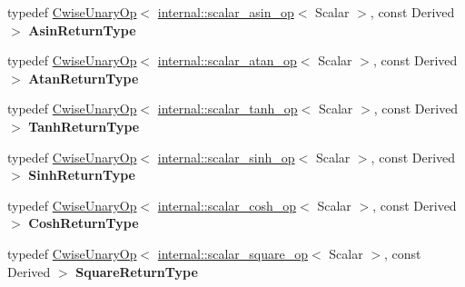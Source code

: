 \begin{DoxyCompactItemize}
\item 
\mbox{\label{class_eigen_1_1_array_base_a25242176c6e595e2de6fc2ef34cf60f1}} 
typedef \mbox{\hyperlink{class_eigen_1_1_cwise_unary_op}{Cwise\+Unary\+Op}}$<$ \mbox{\hyperlink{struct_eigen_1_1internal_1_1scalar__asin__op}{internal\+::scalar\+\_\+asin\+\_\+op}}$<$ Scalar $>$, const Derived $>$ {\bfseries Asin\+Return\+Type}
\item 
\mbox{\label{class_eigen_1_1_array_base_ab7619cd88910262bfc6073eae037596e}} 
typedef \mbox{\hyperlink{class_eigen_1_1_cwise_unary_op}{Cwise\+Unary\+Op}}$<$ \mbox{\hyperlink{struct_eigen_1_1internal_1_1scalar__atan__op}{internal\+::scalar\+\_\+atan\+\_\+op}}$<$ Scalar $>$, const Derived $>$ {\bfseries Atan\+Return\+Type}
\item 
\mbox{\label{class_eigen_1_1_array_base_a630c16d155b76cdb7e0cb85ade17bef7}} 
typedef \mbox{\hyperlink{class_eigen_1_1_cwise_unary_op}{Cwise\+Unary\+Op}}$<$ \mbox{\hyperlink{struct_eigen_1_1internal_1_1scalar__tanh__op}{internal\+::scalar\+\_\+tanh\+\_\+op}}$<$ Scalar $>$, const Derived $>$ {\bfseries Tanh\+Return\+Type}
\item 
\mbox{\label{class_eigen_1_1_array_base_a05f31103e0484219119dd74d29dec8d7}} 
typedef \mbox{\hyperlink{class_eigen_1_1_cwise_unary_op}{Cwise\+Unary\+Op}}$<$ \mbox{\hyperlink{struct_eigen_1_1internal_1_1scalar__sinh__op}{internal\+::scalar\+\_\+sinh\+\_\+op}}$<$ Scalar $>$, const Derived $>$ {\bfseries Sinh\+Return\+Type}
\item 
\mbox{\label{class_eigen_1_1_array_base_afc21591babf48d4be6f72a8c587da860}} 
typedef \mbox{\hyperlink{class_eigen_1_1_cwise_unary_op}{Cwise\+Unary\+Op}}$<$ \mbox{\hyperlink{struct_eigen_1_1internal_1_1scalar__cosh__op}{internal\+::scalar\+\_\+cosh\+\_\+op}}$<$ Scalar $>$, const Derived $>$ {\bfseries Cosh\+Return\+Type}
\item 
\mbox{\label{class_eigen_1_1_array_base_a185918431c160c361d5c34fd6787644b}} 
typedef \mbox{\hyperlink{class_eigen_1_1_cwise_unary_op}{Cwise\+Unary\+Op}}$<$ \mbox{\hyperlink{struct_eigen_1_1internal_1_1scalar__square__op}{internal\+::scalar\+\_\+square\+\_\+op}}$<$ Scalar $>$, const Derived $>$ {\bfseries Square\+Return\+Type}

\end{DoxyCompactItemize}
